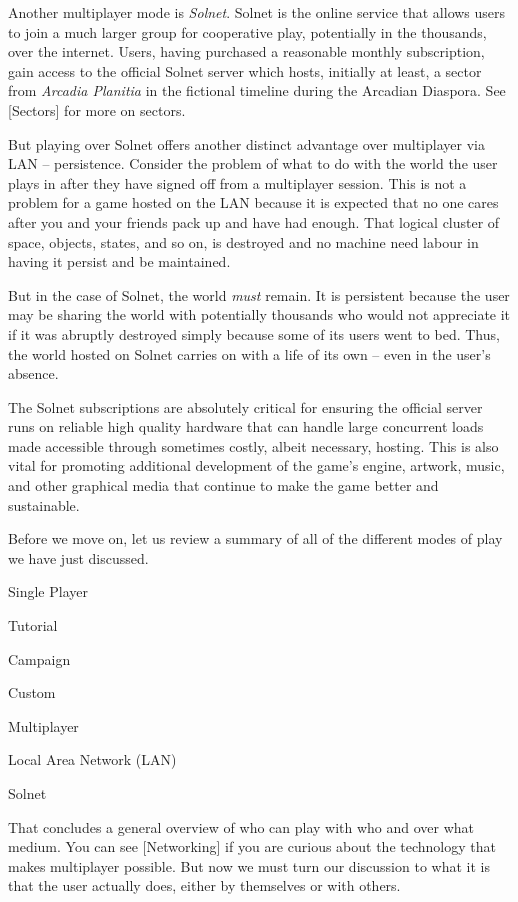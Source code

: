 

Another multiplayer mode is {\it Solnet}. Solnet is the online service that allows users to join a much larger group for cooperative play, potentially in the thousands, over the internet. Users, having purchased a reasonable monthly subscription, gain access to the official Solnet server which hosts, initially at least, a sector from {\it Arcadia Planitia} in the fictional timeline during the Arcadian Diaspora. See [Sectors] for more on sectors.

But playing over Solnet offers another distinct advantage over multiplayer via LAN -- persistence. Consider the problem of what to do with the world the user plays in after they have signed off from a multiplayer session. This is not a problem for a game hosted on the LAN because it is expected that no one cares after you and your friends pack up and have had enough. That logical cluster of space, objects, states, and so on, is destroyed and no machine need labour in having it persist and be maintained. 

But in the case of Solnet, the world {\it must} remain. It is persistent because the user may be sharing the world with potentially thousands who would not appreciate it if it was abruptly destroyed simply because some of its users went to bed. Thus, the world hosted on Solnet carries on with a life of its own -- even in the user's absence.

The Solnet subscriptions are absolutely critical for ensuring the official server runs on reliable high quality hardware that can handle large concurrent loads made accessible through sometimes costly, albeit necessary, hosting. This is also vital for promoting additional development of the game's engine, artwork, music, and other graphical media that continue to make the game better and sustainable.

Before we move on, let us review a summary of all of the different modes of play we have just discussed.

\startitemize[4]
    \item Single Player
        \startitemize[4]
        \item Tutorial
        \item Campaign
        \item Custom
        \stopitemize

    \item Multiplayer
        \startitemize[4]
        \item Local Area Network (LAN)
        \item Solnet
        \stopitemize
\stopitemize

That concludes a general overview of who can play with who and over what medium. You can see [Networking] if you are curious about the technology that makes multiplayer possible. But now we must turn our discussion to what it is that the user actually does, either by themselves or with others.

